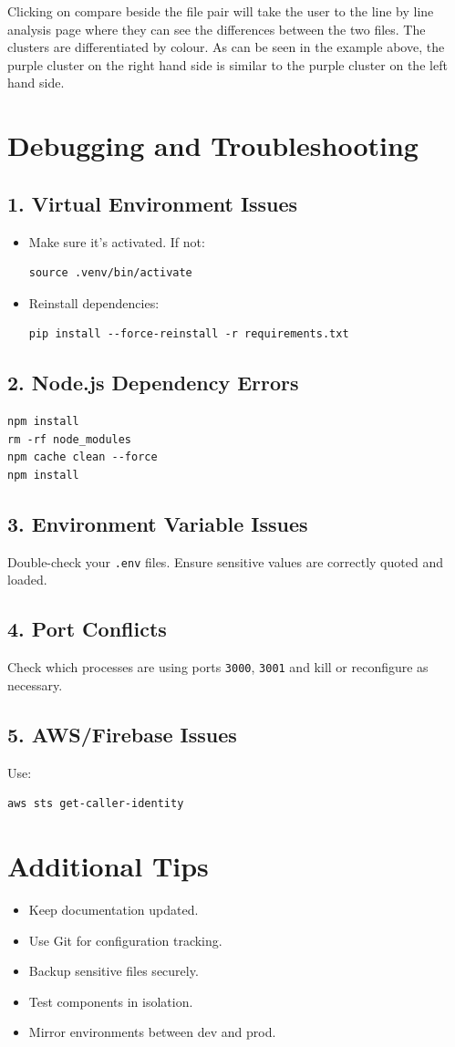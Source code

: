 \documentclass{article}
\begin{document}
Clicking on compare beside the file pair will take the user to the line by line analysis page where they can see the differences between the two files.
The clusters are differentiated by colour. As can be seen in the example above, the purple cluster on the right hand side is similar to the purple cluster on the left hand side.

\section{Debugging and Troubleshooting}

\subsection*{1. Virtual Environment Issues}
\begin{itemize}
    \item Make sure it's activated. If not:
\begin{Verbatim}[fontsize=\small]
source .venv/bin/activate
\end{Verbatim}
    \item Reinstall dependencies:
\begin{Verbatim}[fontsize=\small]
pip install --force-reinstall -r requirements.txt
\end{Verbatim}
\end{itemize}

\subsection*{2. Node.js Dependency Errors}
\begin{Verbatim}[fontsize=\small]
npm install
rm -rf node_modules
npm cache clean --force
npm install
\end{Verbatim}

\subsection*{3. Environment Variable Issues}
Double-check your \texttt{.env} files. Ensure sensitive values are correctly quoted and loaded.

\subsection*{4. Port Conflicts}
Check which processes are using ports \texttt{3000}, \texttt{3001} and kill or reconfigure as necessary.

\subsection*{5. AWS/Firebase Issues}
Use:
\begin{Verbatim}[fontsize=\small]
aws sts get-caller-identity
\end{Verbatim}

\section{Additional Tips}
\begin{itemize}
    \item Keep documentation updated.
    \item Use Git for configuration tracking.
    \item Backup sensitive files securely.
    \item Test components in isolation.
    \item Mirror environments between dev and prod.
\end{itemize}
\end{document}

